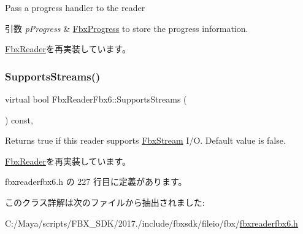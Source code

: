 Pass a progress handler to the reader 
\begin{DoxyParams}{引数}
{\em p\+Progress} & \hyperlink{class_fbx_progress}{Fbx\+Progress} to store the progress information. \\
\hline
\end{DoxyParams}


\hyperlink{class_fbx_reader_aeba190e276718b1abfa6c26a83d2c363}{Fbx\+Reader}を再実装しています。

\mbox{\label{class_fbx_reader_fbx6_ad38deb810e2c73562b9748486f4476bb}} 
\subsubsection{\texorpdfstring{Supports\+Streams()}{SupportsStreams()}}
{\footnotesize\ttfamily virtual bool Fbx\+Reader\+Fbx6\+::\+Supports\+Streams (\begin{DoxyParamCaption}{ }\end{DoxyParamCaption}) const\hspace{0.3cm}{\ttfamily [inline]}, {\ttfamily [virtual]}}

Returns true if this reader supports \hyperlink{class_fbx_stream}{Fbx\+Stream} I/O. Default value is false. 

\hyperlink{class_fbx_reader_ab08a9e71a059ef6052e7fe2d8ba6c35d}{Fbx\+Reader}を再実装しています。



 fbxreaderfbx6.\+h の 227 行目に定義があります。



このクラス詳解は次のファイルから抽出されました\+:\begin{DoxyCompactItemize}
\item 
C\+:/\+Maya/scripts/\+F\+B\+X\+\_\+\+S\+D\+K/2017./include/fbxsdk/fileio/fbx/\hyperlink{fbxreaderfbx6_8h}{fbxreaderfbx6.\+h}\end{DoxyCompactItemize}

